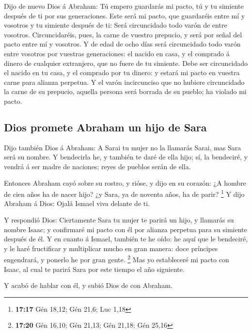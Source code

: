  Dijo de nuevo Dios á Abraham: Tú empero guardarás mi
pacto, tú y tu simiente después de ti por sus generaciones.
 Este será mi pacto, que guardaréis entre mí y vosotros y
tu simiente después de ti: Será circuncidado todo varón de entre
vosotros.  Circuncidaréis, pues, la carne de vuestro
prepucio, y será por señal del pacto entre mí y vosotros.
 Y de edad de ocho días será circuncidado todo varón
entre vosotros por vuestras generaciones: el nacido en casa, y el
comprado á dinero de cualquier extranjero, que no fuere de tu simiente.
 Debe ser circuncidado el nacido en tu casa, y el
comprado por tu dinero: y estará mi pacto en vuestra carne para alianza
perpetua.  Y el varón incircunciso que no hubiere
circuncidado la carne de su prepucio, aquella persona será borrada de su
pueblo; ha violado mi pacto.

\hypertarget{dios-promete-abraham-un-hijo-de-sara}{%
\subsection{Dios promete Abraham un hijo de
Sara}\label{dios-promete-abraham-un-hijo-de-sara}}

 Dijo también Dios á Abraham: A Sarai tu mujer no la
llamarás Sarai, mas Sara será su nombre.  Y bendecirla
he, y también te daré de ella hijo; sí, la bendeciré, y vendrá á ser
madre de naciones; reyes de pueblos serán de ella.

 Entonces Abraham cayó sobre su rostro, y rióse, y dijo
en su corazón: ¿A hombre de cien años ha de nacer hijo? ¿y Sara, ya de
noventa años, ha de parir? \footnote{\textbf{17:17} Gén 18,12; Gén 21,6;
  Luc 1,18}  Y dijo Abraham á Dios: Ojalá Ismael viva
delante de ti.

 Y respondió Dios: Ciertamente Sara tu mujer te parirá un
hijo, y llamarás su nombre Isaac; y confirmaré mi pacto con él por
alianza perpetua para su simiente después de él.  Y en
cuanto á Ismael, también te he oído: he aquí que le bendeciré, y le haré
fructificar y multiplicar mucho en gran manera: doce príncipes
engendrará, y ponerlo he por gran gente. \footnote{\textbf{17:20} Gén
  16,10; Gén 21,13; Gén 21,18; Gén 25,16}  Mas yo
estableceré mi pacto con Isaac, al cual te parirá Sara por este tiempo
el año siguiente.

 Y acabó de hablar con él, y subió Dios de con Abraham.

